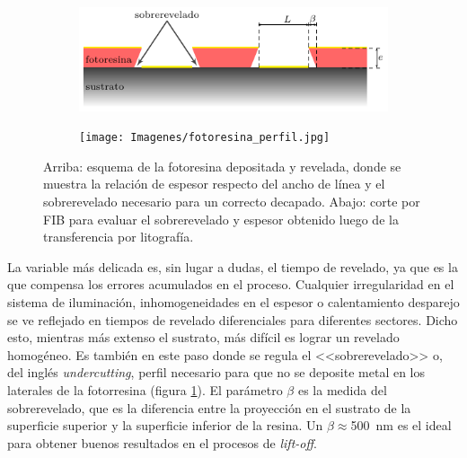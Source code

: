  				\begin{figure}[b!]
 				\centering
 				\begin{subfigure}[t]{0.935\textwidth}
 				\hspace{0.29cm}\includegraphics[width=\textwidth]{Esquemas/altura-ancho.pdf}
 				\end{subfigure}
 				\begin{subfigure}[t]{0.86\textwidth}
 				\texttt{[image: Imagenes/fotoresina\_perfil.jpg]}
 				\end{subfigure}
 				\caption[Perfil de fotorresina para el decapado o\textit{ lift-off}]{Arriba: esquema de la fotoresina depositada y revelada, donde se muestra la relación de espesor respecto del ancho de línea y el sobrerevelado necesario para un correcto decapado. Abajo: corte por FIB para evaluar el sobrerevelado y espesor obtenido luego de la transferencia por litografía.}
 				\label{fig:undercut}
 				\end{figure}

 	   		 La variable más delicada es, sin lugar a dudas, el tiempo de revelado, ya que es la que compensa los errores acumulados en el proceso. Cualquier irregularidad en el sistema de iluminación, inhomogeneidades en el espesor o calentamiento desparejo se ve reflejado en tiempos de revelado diferenciales para diferentes sectores. Dicho esto, mientras más extenso el sustrato, más difícil es lograr un revelado homogéneo. Es también en este paso donde se regula el <<sobrerevelado>> o, del inglés \textit{undercutting}, perfil necesario para que no se deposite metal en los laterales de la fotorresina (figura \ref{fig:undercut}). El parámetro $\beta$ es la medida del sobrerevelado, que es la diferencia entre la proyección en el sustrato de la superficie superior y la superficie inferior de la resina. Un $\beta\!\!\approx$\SI{500}{\nm} es el ideal para obtener buenos resultados en el procesos de \textit{lift-off}. 
 
